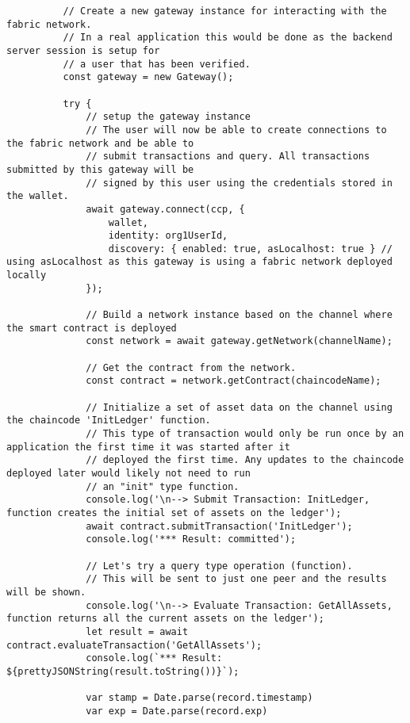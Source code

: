 \begin{lstlisting}
          // Create a new gateway instance for interacting with the fabric network.
          // In a real application this would be done as the backend server session is setup for
          // a user that has been verified.
          const gateway = new Gateway();
  
          try {
              // setup the gateway instance
              // The user will now be able to create connections to the fabric network and be able to
              // submit transactions and query. All transactions submitted by this gateway will be
              // signed by this user using the credentials stored in the wallet.
              await gateway.connect(ccp, {
                  wallet,
                  identity: org1UserId,
                  discovery: { enabled: true, asLocalhost: true } // using asLocalhost as this gateway is using a fabric network deployed locally
              });
  
              // Build a network instance based on the channel where the smart contract is deployed
              const network = await gateway.getNetwork(channelName);
  
              // Get the contract from the network.
              const contract = network.getContract(chaincodeName);
  
              // Initialize a set of asset data on the channel using the chaincode 'InitLedger' function.
              // This type of transaction would only be run once by an application the first time it was started after it
              // deployed the first time. Any updates to the chaincode deployed later would likely not need to run
              // an "init" type function.
              console.log('\n--> Submit Transaction: InitLedger, function creates the initial set of assets on the ledger');
              await contract.submitTransaction('InitLedger');
              console.log('*** Result: committed');
  
              // Let's try a query type operation (function).
              // This will be sent to just one peer and the results will be shown.
              console.log('\n--> Evaluate Transaction: GetAllAssets, function returns all the current assets on the ledger');
              let result = await contract.evaluateTransaction('GetAllAssets');
              console.log(`*** Result: ${prettyJSONString(result.toString())}`);
  
              var stamp = Date.parse(record.timestamp)
              var exp = Date.parse(record.exp)
  

\end{lstlisting}
